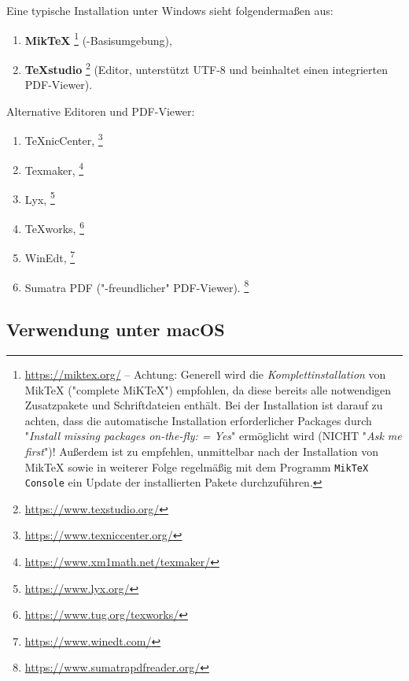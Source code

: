 Eine typische Installation unter Windows sieht folgendermaßen aus:
%
\begin{enumerate}
\item \textbf{MikTeX}%
	\footnote{\url{https://miktex.org/} -- Achtung:
	Generell wird die \emph{Komplettinstallation} von MikTeX ("complete
	MiKTeX") empfohlen, da diese bereits alle notwendigen Zusatzpakete und
	Schriftdateien enthält. Bei der Installation ist darauf zu achten,
	dass die automatische Installation erforderlicher Packages durch
	"\emph{Install missing packages on-the-fly: = Yes}" ermöglicht wird
	(NICHT "\emph{Ask me first}")! Außerdem ist zu empfehlen, unmittelbar
	nach der Installation von MikTeX sowie in weiterer Folge regelmäßig
	mit dem Programm \texttt{MikTeX Console} ein Update der installierten
	Pakete durchzuführen.} (\latex-Basisumgebung),
\item \textbf{TeXstudio}%
	\footnote{\url{https://www.texstudio.org/}}
	(Editor, unterstützt UTF-8 und beinhaltet einen integrierten PDF-Viewer).
\end{enumerate}
%
Alternative Editoren und PDF-Viewer:
%
\begin{enumerate}
	\item TeXnicCenter,%
	\footnote{\url{https://www.texniccenter.org/}}
	\item Texmaker,%
	\footnote{\url{https://www.xm1math.net/texmaker/}}
	\item Lyx,%
	\footnote{\url{https://www.lyx.org/}}
	\item TeXworks,%
	\footnote{\url{https://www.tug.org/texworks/}}
	\item WinEdt,%
	\footnote{\url{https://www.winedt.com/}}
	\item Sumatra PDF ("\latex-freundlicher" PDF-Viewer).%
	\footnote{\url{https://www.sumatrapdfreader.org/}}
\end{enumerate}

\subsection{Verwendung unter macOS}

